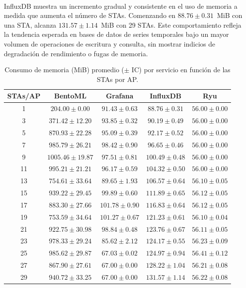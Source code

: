 \\
InfluxDB muestra un incremento gradual y consistente en el uso de memoria a medida que aumenta el número de STAs. Comenzando en $88.76 \pm 0.31$~MiB con una STA, alcanza $131.57 \pm 1.14$~MiB con 29 STAs. Este comportamiento refleja la tendencia esperada en bases de datos de series temporales bajo un mayor volumen de operaciones de escritura y consulta, sin mostrar indicios de degradación de rendimiento o fugas de memoria.

\begin{table}[ht!]
\centering
\begin{tabular}{|c|c|c|c|c|}
\hline
\textbf{STAs/AP} & \textbf{BentoML} & \textbf{Grafana} & \textbf{InfluxDB} & \textbf{Ryu} \\
\hline
1  & $204.00 \pm 0.00$ & $91.43 \pm 0.63$ & $88.76 \pm 0.31$ & $56.00 \pm 0.00$ \\ \hline
3  & $371.42 \pm 12.20$ & $93.85 \pm 0.32$ & $90.19 \pm 0.49$ & $56.00 \pm 0.00$ \\ \hline
5  & $870.93 \pm 22.28$ & $95.09 \pm 0.39$ & $92.17 \pm 0.52$ & $56.00 \pm 0.00$ \\ \hline
7  & $985.79 \pm 26.21$ & $98.42 \pm 0.90$ & $96.65 \pm 0.46$ & $56.00 \pm 0.00$ \\ \hline
9  & $1005.46 \pm 19.87$ & $97.51 \pm 0.81$ & $100.49 \pm 0.48$ & $56.00 \pm 0.00$ \\ \hline
11 & $995.21 \pm 21.21$ & $96.17 \pm 0.59$ & $104.32 \pm 0.50$ & $56.00 \pm 0.00$ \\ \hline
13 & $754.61 \pm 33.64$ & $89.65 \pm 1.93$ & $106.57 \pm 0.64$ & $56.10 \pm 0.05$ \\ \hline
15 & $939.22 \pm 29.45$ & $99.89 \pm 0.60$ & $111.89 \pm 0.65$ & $56.12 \pm 0.05$ \\ \hline
17 & $883.30 \pm 27.66$ & $101.78 \pm 0.90$ & $116.83 \pm 0.64$ & $56.12 \pm 0.05$ \\ \hline
19 & $753.59 \pm 34.64$ & $101.27 \pm 0.67$ & $121.23 \pm 0.61$ & $56.10 \pm 0.04$ \\ \hline
21 & $922.75 \pm 30.98$ & $98.84 \pm 0.48$ & $123.76 \pm 0.67$ & $56.11 \pm 0.05$ \\ \hline
23 & $978.33 \pm 29.24$ & $85.62 \pm 2.12$ & $124.17 \pm 0.55$ & $56.23 \pm 0.09$ \\ \hline
25 & $985.62 \pm 29.87$ & $67.03 \pm 0.02$ & $124.97 \pm 0.94$ & $56.41 \pm 0.12$ \\ \hline
27 & $867.90 \pm 27.61$ & $67.00 \pm 0.00$ & $128.22 \pm 1.04$ & $56.21 \pm 0.08$ \\ \hline
29 & $940.72 \pm 33.25$ & $67.00 \pm 0.00$ & $131.57 \pm 1.14$ & $56.22 \pm 0.08$ \\ 
\hline
\end{tabular}
\caption{Consumo de memoria (MiB) promedio ($\pm$ IC) por servicio en función de las STAs por AP.}
\label{tab:service-consumption}
\end{table}

